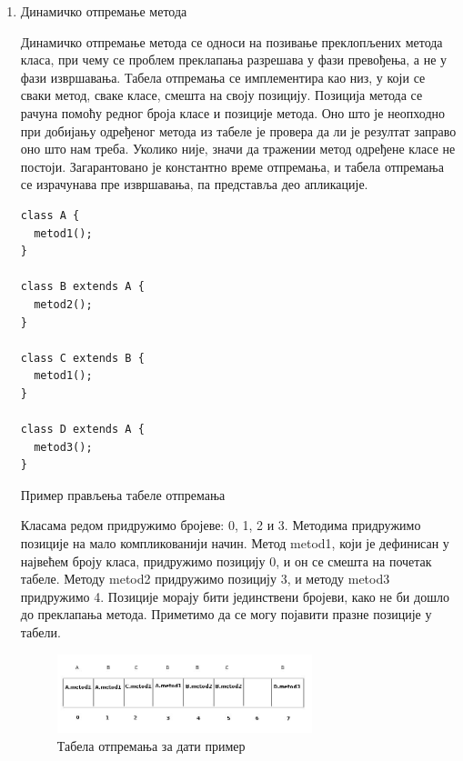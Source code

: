 \documentclass[12pt,oneside]{memoir}
\begin{document}
\begin{enumerate}
\item Динамичко отпремање метода

Динамичко отпремање метода се односи на позивање преклопљених метода класа, при чему се проблем преклапања разрешава у фази превођења, а не у фази извршавања. Табела отпремања се имплементира као низ, у који се сваки метод, сваке класе, смешта на своју позицију. Позиција метода се рачуна помоћу редног броја класе и  позиције метода. Оно што је неопходно при добијању одређеног метода из табеле је провера да ли је резултат заправо оно што нам треба. Уколико није, значи да тражении метод одређене класе не постоји. Загарантовано је константно време отпремања, и табела отпремања се израчунава пре извршавања, па представља део апликације.

\begin{listing}
\begin{verbatim}
class A {
  metod1();
}

class B extends A {
  metod2();
}

class C extends B {
  metod1();
}

class D extends A {
  metod3();
}
\end{verbatim}
\caption{Пример прављења табеле отпремања}
\label{dispatchTable}
\end{listing}

Класама редом придружимо бројеве: 0, 1, 2 и 3. Методима придружимо позиције на мало компликованији начин. Метод metod1, који је дефинисан у највећем броју класа, придружимо позицију 0, и он се смешта на почетак табеле. Методу metod2 придружимо позицију 3, и методу metod3 придружимо 4. Позиције морају бити јединствени бројеви, како не би дошло до преклапања метода. Приметимо да се могу појавити празне позиције у табели.

\begin{figure}[!ht]
  \centering
  \includegraphics[width=0.7\textwidth]{otpremanje.jpg}
  \caption{Табела отпремања за дати пример}
  \label{fig:model}
\end{figure}


\end{enumerate}
\end{document}
